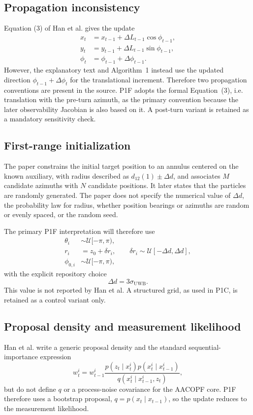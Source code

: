 \subsection{Propagation inconsistency}
Equation (3) of Han et al. gives the update
\begin{align}
    x_t &= x_{t-1}+\Delta L_{t-1}\cos\phi_{t-1},\\
    y_t &= y_{t-1}+\Delta L_{t-1}\sin\phi_{t-1},\\
    \phi_t &= \phi_{t-1}+\Delta\phi_{t-1}.
\end{align}
However, the explanatory text and Algorithm~1 instead use the updated direction $\phi_{t-1}+\Delta\phi_t$ for the translational increment. Therefore two propagation conventions are present in the source. P1F adopts the formal Equation~(3), i.e. translation with the pre-turn azimuth, as the primary convention because the later observability Jacobian is also based on it. A post-turn variant is retained as a mandatory sensitivity check.

\subsection{First-range initialization}
The paper constrains the initial target position to an annulus centered on the known auxiliary, with radius described as $d_{12}(1)\pm\Delta d$, and associates $M$ candidate azimuths with $N$ candidate positions. It later states that the particles are randomly generated. The paper does not specify the numerical value of $\Delta d$, the probability law for radius, whether position bearings or azimuths are random or evenly spaced, or the random seed.

The primary P1F interpretation will therefore use
\begin{align}
    \theta_i &\sim \mathcal U[-\pi,\pi),\\
    r_i &= z_0+\delta r_i,\qquad \delta r_i\sim\mathcal U[-\Delta d,\Delta d],\\
    \phi_{0,i} &\sim\mathcal U[-\pi,\pi),
\end{align}
with the explicit repository choice
\begin{equation}
    \Delta d=3\sigma_{\mathrm{UWB}}.
\end{equation}
This value is not reported by Han et al. A structured grid, as used in P1C, is retained as a control variant only.

\subsection{Proposal density and measurement likelihood}
Han et al. write a generic proposal density and the standard sequential-importance expression
\begin{equation}
    w_t^i=w_{t-1}^i
    \frac{p(z_t\mid x_t^i)p(x_t^i\mid x_{t-1}^i)}
         {q(x_t^i\mid x_{t-1}^i,z_t)},
\end{equation}
but do not define $q$ or a process-noise covariance for the AACOPF core. P1F therefore uses a bootstrap proposal, $q=p(x_t\mid x_{t-1})$, so the update reduces to the measurement likelihood.

